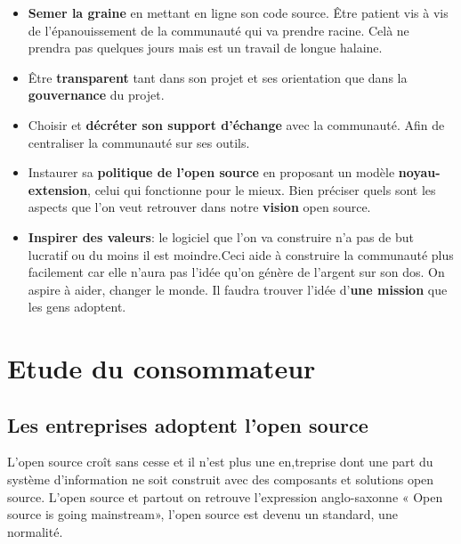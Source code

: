 			\begin{itemize}[label=\textbullet, font=\LARGE \color{burntorange}]
				\item \textbf{Semer la graine} en mettant en ligne son code source. Être patient vis à vis de l'épanouissement de la communauté qui va prendre racine. Celà ne prendra pas quelques jours mais est un travail de longue halaine.
				\item Être \textbf{transparent} tant dans son projet et ses orientation que dans la \textbf{gouvernance} du projet.
				\item Choisir et \textbf{décréter son support d'échange} avec la communauté. Afin de centraliser la communauté sur ses outils.
				\item Instaurer sa \textbf{politique de l'open source} en proposant un modèle \textbf{noyau-extension}, celui qui fonctionne pour le mieux. Bien préciser quels sont les aspects que l'on veut retrouver dans notre \textbf{vision} open source.
				\item \textbf{Inspirer des valeurs}: le logiciel que l'on va construire n'a pas de but lucratif ou du moins il est moindre.Ceci aide à construire la communauté plus facilement car elle n'aura pas l'idée qu'on génère de l'argent sur son dos. On aspire à aider, changer le monde. Il faudra trouver l'idée d'\textbf{une mission} que les gens adoptent.
			\end{itemize}

	\section{Etude du consommateur} %

		\subsection{Les entreprises adoptent l'open source}

			L'open source croît sans cesse et il n'est plus une en,treprise dont une part du système d'information ne soit construit avec des composants et solutions open source. L'open source et partout on retrouve l'expression anglo-saxonne « Open source is going mainstream», l'open source est devenu un standard, une normalité.\\

